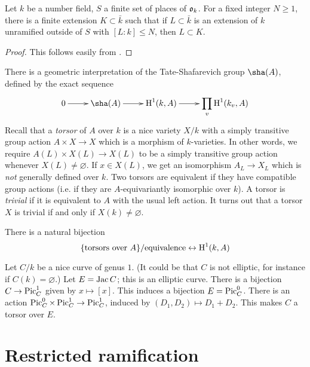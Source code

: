 \documentclass{article}
\begin{document}
\begin{theorem}[Hermite]\label{thm:hermite}
Let $k$ be a number field, $S$ a finite set of places of $\mathfrak{o}_k$. For a fixed 
integer $N\geqslant 1$, there is a finite extension $K\subset \bar k$ such that 
if $L\subset \bar k$ is an extension of $k$ unramified outside of $S$ with 
$[L:k]\leqslant N$, then $L\subset K$. 
\end{theorem}
\begin{proof}
This follows easily from \cite[B.2.14]{bg06}. 
\end{proof}

There is a geometric interpretation of the Tate-Shafarevich group $\sha(A)$, 
defined by the exact sequence 
\[\xymatrix{
  0 \ar[r] 
    & \sha(A) \ar[r] 
    & \h^1(k,A) \ar[r] 
    & \displaystyle\prod_v \h^1(k_v,A)
 }\]
Recall that a \emph{torsor} of $A$ over $k$ is a nice variety $X/k$ with a 
simply transitive group action $A\times X\to X$ which is a morphism of 
$k$-varieties. In other words, we require $A(L)\times X(L)\to X(L)$ to be 
a simply transitive group action whenever $X(L)\ne\varnothing$. If 
$x\in X(L)$, we get an isomorphism $A_L\to X_L$ which is \emph{not} generally 
defined over $k$. Two torsors are equivalent if they have compatible group 
actions (i.e. if they are $A$-equivariantly isomorphic over $k$). A torsor is 
\emph{trivial} if it is equivalent to $A$ with the usual left action. It turns 
out that a torsor $X$ is trivial if and only if $X(k)\ne\varnothing$. 

There is a natural bijection 
\[
  \{\text{torsors over $A$}\}/\text{equivalence} \leftrightarrow \operatorname{H}^1(k,A)
\]

\begin{example}
Let $C/k$ be a nice curve of genus $1$. (It could be that $C$ is not elliptic, 
for instance if $C(k)=\varnothing$.) Let $E=\operatorname{Jac} C$; this is an elliptic curve. 
There is a bijection $C\to \operatorname{Pic}_C^1$ given by $x\mapsto [x]$. This induces a 
bijection $E=\operatorname{Pic}_C^0$. There is an action 
$\operatorname{Pic}_C^0\times \operatorname{Pic}_C^1\to \operatorname{Pic}_C^1$, induced by $(D_1,D_2)\mapsto D_1+D_2$. 
This makes $C$ a torsor over $E$. 
\end{example}





\section{Restricted ramification}
\end{document}
